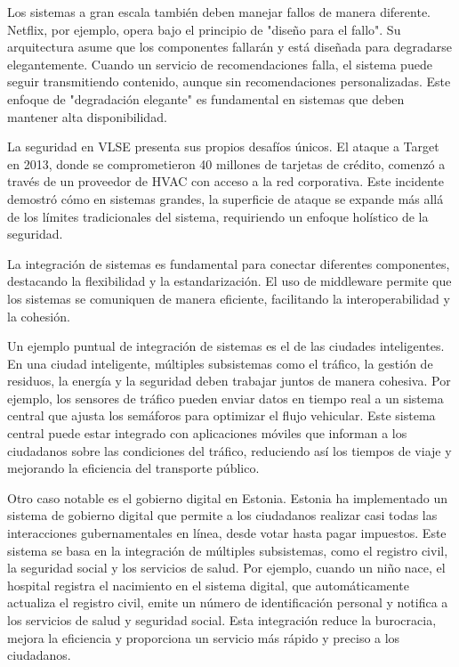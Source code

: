 Los sistemas a gran escala también deben manejar fallos de manera diferente. Netflix, por ejemplo, opera bajo el principio de "diseño para el fallo". Su arquitectura asume que los componentes fallarán y está diseñada para degradarse elegantemente. Cuando un servicio de recomendaciones falla, el sistema puede seguir transmitiendo contenido, aunque sin recomendaciones personalizadas. Este enfoque de "degradación elegante" es fundamental en sistemas que deben mantener alta disponibilidad.

La seguridad en VLSE presenta sus propios desafíos únicos. El ataque a Target en 2013, donde se comprometieron 40 millones de tarjetas de crédito, comenzó a través de un proveedor de HVAC con acceso a la red corporativa. Este incidente demostró cómo en sistemas grandes, la superficie de ataque se expande más allá de los límites tradicionales del sistema, requiriendo un enfoque holístico de la seguridad.

La integración de sistemas es fundamental para conectar diferentes componentes, destacando la flexibilidad y la estandarización. El uso de middleware permite que los sistemas se comuniquen de manera eficiente, facilitando la interoperabilidad y la cohesión. 

Un ejemplo puntual de integración de sistemas es el de las ciudades inteligentes. En una ciudad inteligente, múltiples subsistemas como el tráfico, la gestión de residuos, la energía y la seguridad deben trabajar juntos de manera cohesiva. Por ejemplo, los sensores de tráfico pueden enviar datos en tiempo real a un sistema central que ajusta los semáforos para optimizar el flujo vehicular. Este sistema central puede estar integrado con aplicaciones móviles que informan a los ciudadanos sobre las condiciones del tráfico, reduciendo así los tiempos de viaje y mejorando la eficiencia del transporte público.

Otro caso notable es el gobierno digital en Estonia. Estonia ha implementado un sistema de gobierno digital que permite a los ciudadanos realizar casi todas las interacciones gubernamentales en línea, desde votar hasta pagar impuestos. Este sistema se basa en la integración de múltiples subsistemas, como el registro civil, la seguridad social y los servicios de salud. Por ejemplo, cuando un niño nace, el hospital registra el nacimiento en el sistema digital, que automáticamente actualiza el registro civil, emite un número de identificación personal y notifica a los servicios de salud y seguridad social. Esta integración reduce la burocracia, mejora la eficiencia y proporciona un servicio más rápido y preciso a los ciudadanos.

